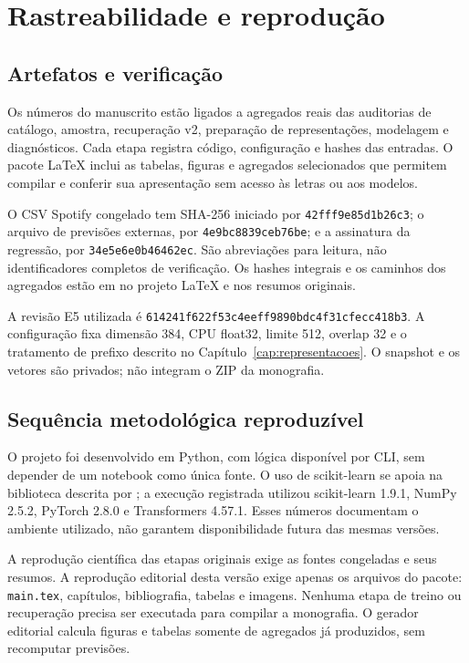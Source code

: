 \chapter{Rastreabilidade e reprodução}\label{ap:reproducao}
\section{Artefatos e verificação}
Os números do manuscrito estão ligados a agregados reais das auditorias de catálogo, amostra, recuperação v2, preparação de representações, modelagem e diagnósticos. Cada etapa registra código, configuração e hashes das entradas. O pacote LaTeX inclui as tabelas, figuras e agregados selecionados que permitem compilar e conferir sua apresentação sem acesso às letras ou aos modelos.

O CSV Spotify congelado tem SHA-256 iniciado por \texttt{42fff9e85d1b26c3}; o arquivo de previsões externas, por \texttt{4e9bc8839ceb76be}; e a assinatura da regressão, por \texttt{34e5e6e0b46462ec}. São abreviações para leitura, não identificadores completos de verificação. Os hashes integrais e os caminhos dos agregados estão em  no projeto LaTeX e nos resumos originais.

A revisão E5 utilizada é \texttt{614241f622f53c4eeff9890bdc4f31cfecc418b3}. A configuração fixa dimensão 384, CPU float32, limite 512, overlap 32 e o tratamento de prefixo descrito no Capítulo~\ref{cap:representacoes}. O snapshot e os vetores são privados; não integram o ZIP da monografia.

\section{Sequência metodológica reproduzível}
O projeto foi desenvolvido em Python, com lógica disponível por CLI, sem depender de um notebook como única fonte. O uso de scikit-learn se apoia na biblioteca descrita por \citet{pedregosa2011}; a execução registrada utilizou scikit-learn 1.9.1, NumPy 2.5.2, PyTorch 2.8.0 e Transformers 4.57.1. Esses números documentam o ambiente utilizado, não garantem disponibilidade futura das mesmas versões.

A reprodução científica das etapas originais exige as fontes congeladas e seus resumos. A reprodução editorial desta versão exige apenas os arquivos do pacote: \texttt{main.tex}, capítulos, bibliografia, tabelas e imagens. Nenhuma etapa de treino ou recuperação precisa ser executada para compilar a monografia. O gerador editorial calcula figuras e tabelas somente de agregados já produzidos, sem recomputar previsões.

